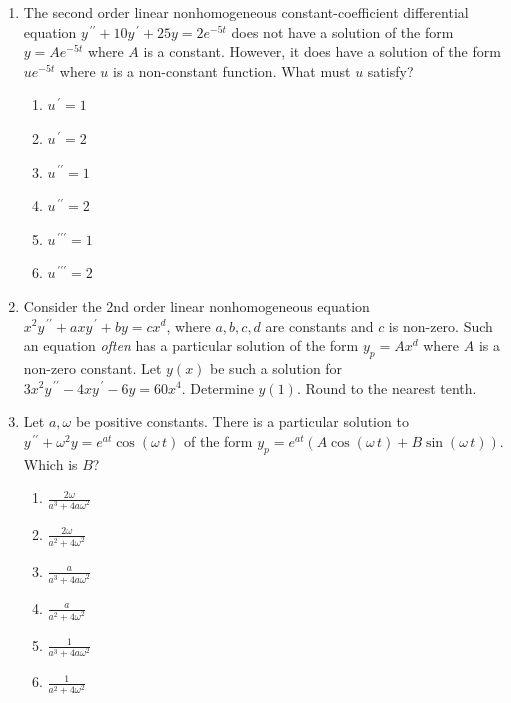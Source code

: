 \documentclass{ximera}
\begin{document}
\begin{enumerate}[label=(\arabic*)]

 \item The second order linear nonhomogeneous constant-coefficient differential equation $y^{\,\prime\prime}+10y^{\,\prime}+25y=2e^{-5t}$ does not have a solution of the form $y=Ae^{-5t}$ where $A$ is a constant.  However, it does have a solution of the form $ue^{-5t}$ where $u$ is a non-constant function.  What must $u$ satisfy?

\begin{enumerate}[label=(\alph*)]
\item $u^{\,\prime}=1$
\item $u^{\,\prime}=2$
\item $u^{\,\prime\prime}=1$
\item $u^{\,\prime\prime}=2$ %
\item $u^{\,\prime\prime\prime}=1$
\item $u^{\,\prime\prime\prime}=2$
\end{enumerate}


\newpage

 \item Consider the 2nd order linear nonhomogeneous equation \\$x^2 y^{\,\prime\prime}+ax y^{\,\prime}+by=cx^d$, where $a,b,c,d$ are constants and $c$ is non-zero. Such an equation \emph{often} has a particular solution of the form $y_p=Ax^d$ where $A$ is a non-zero constant.  Let $y(x)$ be such a solution for\\ $3x^2 y^{\,\prime\prime}-4xy^{\,\prime}-6y=60x^4$.  Determine $y(1)$.  Round to the nearest tenth.

 

\item  Let $a,\omega$ be positive constants.  There is a particular solution to \\$y^{\,\prime\prime}+\omega^2 y=e^{at}\cos{(\omega\, t)}$ of the form $y_p=e^{at}(A \cos (\omega\, t)+B \sin (\omega\, t))$.  Which is $B$?  

\begin{enumerate}[label=(\alph*)]
\item $\displaystyle \frac{2\omega}{a^3+4a\omega^2}$ %
\item $\displaystyle \frac{2\omega}{a^2+4\omega^2}$
\item $\displaystyle \frac{a}{a^3+4a\omega^2}$
\item $\displaystyle \frac{a}{a^2+4\omega^2}$
\item $\displaystyle \frac{1}{a^3+4a\omega^2}$
\item $\displaystyle \frac{1}{a^2+4\omega^2}$
\end{enumerate}




\end{enumerate}
\end{document}
